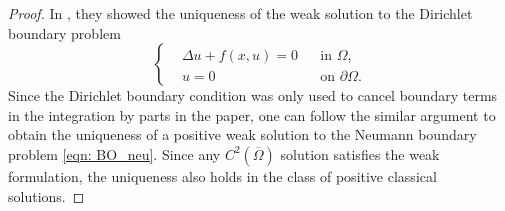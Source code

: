 \documentclass{article}
\begin{document}
\begin{proof}
In \cite{Brezis1986}, they showed the uniqueness of the weak solution to the Dirichlet boundary problem
\begin{equation*}
\left\{\begin{aligned}
&\Delta u + f(x,u)=0 && \text{in }\Omega,\\
&u = 0 &&  \text{on }\partial\Omega.
\end{aligned}\right.
\end{equation*}
Since the Dirichlet boundary condition was only used to cancel boundary terms in the
integration by parts in the paper, one can follow the similar argument to obtain the uniqueness of a positive weak solution to the Neumann boundary problem \eqref{eqn: BO_neu}. Since any $C^{2}(\overline\Omega)$ solution satisfies the weak
formulation, the uniqueness also holds in the class of positive classical
solutions.
\end{proof}
\end{document}
